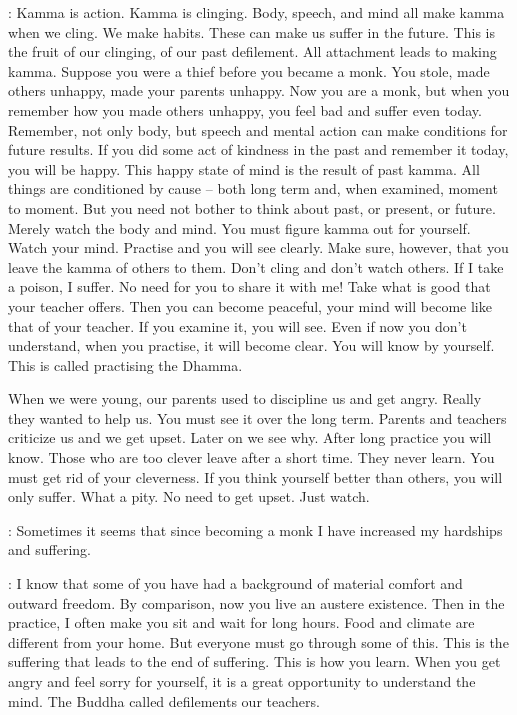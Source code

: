 : Kamma is action. Kamma is clinging. Body, speech, and mind all make kamma when we cling. We make habits. These can make us suffer in the future. This is the fruit of our clinging, of our past defilement. All attachment leads to making kamma. Suppose you were a thief before you became a monk. You stole, made others unhappy, made your parents unhappy. Now you are a monk, but when you remember how you made others unhappy, you feel bad and suffer even today. Remember, not only body, but speech and mental action can make conditions for future results. If you did some act of kindness in the past and remember it today, you will be happy. This happy state of mind is the result of past kamma. All things are conditioned by cause -- both long term and, when examined, moment to moment. But you need not bother to think about past, or present, or future. Merely watch the body and mind. You must figure kamma out for yourself. Watch your mind. Practise and you will see clearly. Make sure, however, that you leave the kamma of others to them. Don't cling and don't watch others. If I take a poison, I suffer. No need for you to share it with me! Take what is good that your teacher offers. Then you can become peaceful, your mind will become like that of your teacher. If you examine it, you will see. Even if now you don't understand, when you practise, it will become clear. You will know by yourself. This is called practising the Dhamma.

When we were young, our parents used to discipline us and get angry. Really they wanted to help us. You must see it over the long term. Parents and teachers criticize us and we get upset. Later on we see why. After long practice you will know. Those who are too clever leave after a short time. They never learn. You must get rid of your cleverness. If you think yourself better than others, you will only suffer. What a pity. No need to get upset. Just watch.

:
Sometimes it seems that since becoming a monk I have increased my hardships and suffering.

: I know that some of you have had a background of material comfort and outward freedom. By comparison, now you live an austere existence. Then in the practice, I often make you sit and wait for long hours. Food and climate are different from your home. But everyone must go through some of this. This is the suffering that leads to the end of suffering. This is how you learn. When you get angry and feel sorry for yourself, it is a great opportunity to understand the mind. The Buddha called defilements our teachers.

